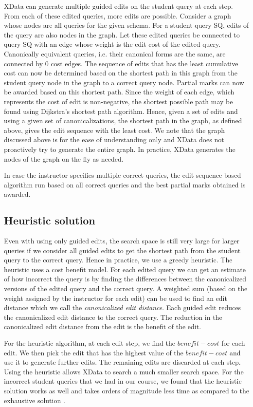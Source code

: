 XData can generate multiple guided edits on the student query at each step. From each of these edited queries, more edits are possible. Consider a graph whose nodes are all queries for the given schema. For a student query  SQ, edits of the query are also nodes in the graph. Let these edited queries be connected to query SQ with an edge whose weight is the edit cost of the edited query. Canonically equivalent queries, i.e. their canonical forms are the same, are connected by 0 cost edges. The sequence of edits that has the least cumulative cost can now be determined based on the shortest path in this graph from the student query node in the graph to a correct query node. Partial marks can now be awarded based on this shortest path.  Since the weight of each edge, which represents the cost of edit is non-negative, the shortest possible path may be found using Dijkstra’s shortest path algorithm. Hence, given a set of edits and using a given set of canonicalizations, the shortest path in the graph, as defined above, gives the edit sequence with the least cost.  
We note that the graph discussed above is for the ease of understanding only and XData does not proactively try to generate the entire graph. In practice, XData generates the nodes of the graph on the fly as needed. 

In case the instructor specifies multiple correct queries, the edit sequence based algorithm run based on all correct queries and the best partial marks obtained is awarded. 

\subsection{Heuristic solution}
Even with using only guided edits, the search space is still very large for larger queries if we consider all guided edits to get the shortest path from the student query to the correct query. Hence in practice, we use a greedy heuristic. The heuristic uses a cost benefit model. For each  edited query we can get an estimate of how incorrect the query is by finding the differences between the canonicalized versions of the edited query and the correct query. A weighted sum (based on the weight assigned by the instructor for each edit) can be used to find an edit distance which we call the \textit{canonicalized edit distance}. Each guided edit reduces the canonicalized edit distance to the correct query. The reduction in the canonicalized edit distance from the edit is the benefit of the edit. 

For the heuristic algorithm, at each edit step, we find the $benefit-cost$ for each edit. We then pick the edit that has the highest value of the $benefit-cost$ and use it to generate further edits. The remaining edits are discarded at each step. Using the heuristic allows XData to search a much smaller search space. For the incorrect student queries that we had in our course, we found that the heuristic solution works as well and takes orders of magnitude less time as compared to the exhaustive solution  \cite{xdata:comad}.



